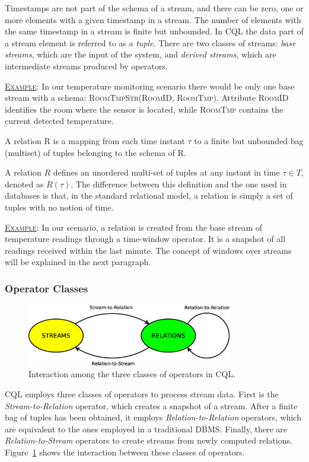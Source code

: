 Timestamps are not part of the schema of a stream, and there can be zero, one or more elements with
a given timestamp in a stream. The number of elements with the same timestamp in a stream is finite but
unbounded.
In CQL the data part of a stream element is referred to as a \textit{tuple}. There are
two classes of streams: \textit{base streams}, which are the input of the system, and \textit{derived
streams}, which are intermediate streams produced by operators. 

\underline{\textsc{Example}}: In our temperature monitoring scenario there would be only one base stream
with a schema: \textsc{RoomTmpStr(RoomID, RoomTmp)}. Attribute \textsc{RoomID} identifies the room where
the sensor is located, while \textsc{RoomTmp} contains the current detected temperature. 

\begin{definition}[Relation]{A relation R is a mapping from each time instant
$\tau$ to a finite but unbounded bag (multiset) of tuples belonging to the
schema of R.}
\end{definition}

A relation $R$ defines an unordered multi-set of tuples at any instant in time $\tau \in T$,
denoted as $R(\tau)$. The difference between this definition and the one used in databases is that, in
the standard relational model, a relation is simply a set of tuples with no notion of time. 

\underline{\textsc{Example}}: In our scenario, a relation is created from the base stream of
temperature readings through a time-window operator. It is a snapshot of all readings received within the last
minute. The concept of windows over streams will be explained in the next paragraph.

\subsubsection*{Operator Classes}
\begin{figure}[b]
	\centering
	\includegraphics[width=0.8\textwidth]{img/tesi/cql_ops} 
	\caption{Interaction among the three classes of operators in CQL.}
	\label{fig:cql_ops}
\end{figure}
CQL employs three classes of operators to process stream data. First is the \textit{Stream-to-Relation}
operator, which creates a snapshot of a stream. After a finite bag of tuples has been
obtained, it employs \textit{Relation-to-Relation} operators, which are equivalent to the ones employed in
a traditional DBMS. Finally, there are \textit{Relation-to-Stream} operators to create streams from
newly computed relations. Figure~\ref{fig:cql_ops} shows the interaction between these classes of
operators. 

